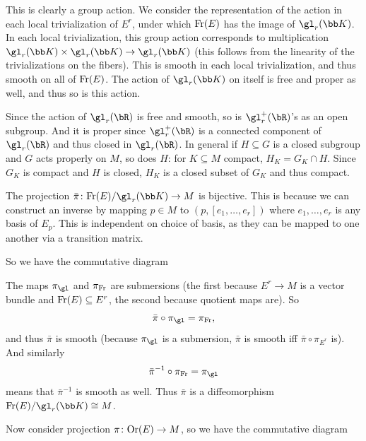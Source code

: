     \item This is clearly a group action.
    We consider the representation of the action in each local trivialization of $E^r$, under which ${\rm Fr}(E)$ has the image of $\gl_r(\bK)$.
    In each local trivialization, this group action corresponds to multiplication $\gl_r(\bK)\times\gl_r(\bK)\to\gl_r(\bK)$ (this follows from the linearity of the trivializations on the fibers).
    This is smooth in each local trivialization, and thus smooth on all of ${\rm Fr}(E)$.
    The action of $\gl_r(\bK)$ on itself is free and proper as well, and thus so is this action.

    Since the action of $\gl_r(\bR)$ is free and smooth, so is $\gl_r^+(\bR)$'s as an open subgroup.
    And it is proper since $\gl_r^+(\bR)$ is a connected component of $\gl_r(\bR)$ and thus closed in $\gl_r(\bR)$.
    In general if $H\subseteq G$ is a closed subgroup and $G$ acts properly on $M$, so does $H$: for $K\subseteq M$ compact, $H_K=G_K\cap H$.
    Since $G_K$ is compact and $H$ is closed, $H_K$ is a closed subset of $G_K$ and thus compact.

    \item The projection $\bar\pi\colon\Fr(E)/\gl_r(\bK)\to M$ is bijective.
    This is because we can construct an inverse by mapping $p\in M$ to $(p,[e_1,\dots,e_r])$ where $e_1,\dots,e_r$ is any basis of $E_p$.
    This is independent on choice of basis, as they can be mapped to one another via a transition matrix.

    So we have the commutative diagram

    \centerline{}

    The maps $\pi_{\gl}$ and $\pi_{\rm Fr}$ are submersions (the first because $E^r\to M$ is a vector bundle and ${\rm Fr}(E)\subseteq E^r$, the second because quotient maps are).
    So
    $$ \bar\pi \circ \pi_\gl = \pi_\Fr , $$
    and thus $\bar\pi$ is smooth (because $\pi_\gl$ is a submersion, $\bar\pi$ is smooth iff $\bar\pi\circ\pi_{E^r}$ is).
    And similarly
    $$ \bar\pi^{-1}\circ\pi_\Fr = \pi_\gl $$
    means that $\bar\pi^{-1}$ is smooth as well.
    Thus $\bar\pi$ is a diffeomorphism $\Fr(E)/\gl_r(\bK)\cong M$.

    Now consider projection $\pi\colon{\rm Or}(E)\to M$, so we have the commutative diagram

